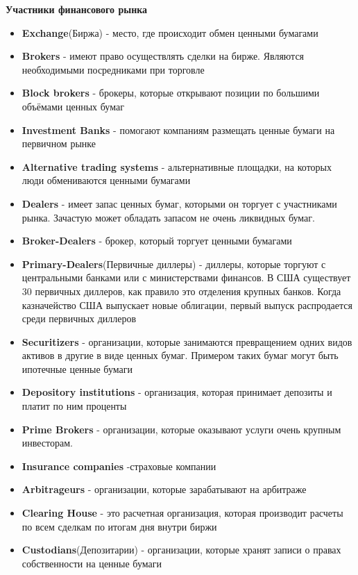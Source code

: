 \documentclass{article}
\begin{document}
\textbf{Участники финансового рынка}
\begin{itemize}
\item\textbf{Exchange}(Биржа) - место, где происходит обмен ценными бумагами
\item\textbf{Brokers} - имеют право осуществлять сделки на бирже. Являются необходимыми посредниками при торговле
\item\textbf{Block brokers} - брокеры, которые открывают позиции по большими объёмами ценных бумаг
\item\textbf{Investment Banks} - помогают компаниям размещать ценные бумаги на первичном рынке
\item\textbf{Alternative trading systems} - альтернативные площадки, на которых люди обмениваются ценными бумагами
\item\textbf{Dealers} - имеет запас ценных бумаг, которыми он торгует с участниками рынка. Зачастую может обладать запасом не очень ликвидных бумаг. 
\item\textbf{Broker-Dealers} - брокер, который торгует ценными бумагами
\item\textbf{Primary-Dealers}(Первичные диллеры) - диллеры, которые торгуют с центральными банками или с министерствами финансов. В США существует 30 первичных диллеров, как правило это отделения крупных банков. Когда казначейство США выпускает новые облигации, первый выпуск распродается среди первичных диллеров
\item\textbf{Securitizers} - организации, которые занимаются превращением одних видов активов в другие в виде ценных бумаг. Примером таких бумаг могут быть ипотечные ценные бумаги
\item\textbf{Depository institutions} - организация, которая принимает депозиты и платит по ним проценты
\item\textbf{Prime Brokers} - организации, которые оказывают услуги очень крупным инвесторам.
\item\textbf{Insurance companies} -страховые компании
\item\textbf{Arbitrageurs} - организации, которые зарабатывают на арбитраже
\item\textbf{Clearing House} - это расчетная организация, которая производит расчеты по всем сделкам по итогам дня внутри биржи
\item\textbf{Custodians}(Депозитарии) - организации, которые хранят записи о правах собственности на ценные бумаги

\end{itemize}
\end{document}
